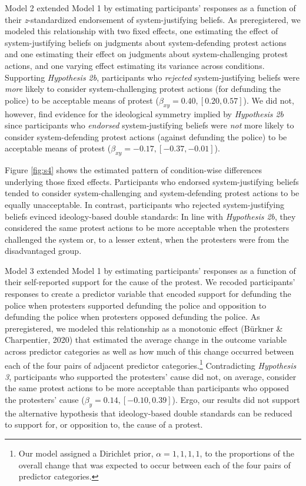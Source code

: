 \documentclass[12pt, letterpaper]{article}
\begin{document}
Model 2 extended Model 1 by estimating participants' responses as a
function of their \emph{z}-standardized endorsement of system-justifying
beliefs. As preregistered, we modeled this relationship with two fixed
effects, one estimating the effect of system-justifying beliefs on
judgments about system-defending protest actions and one estimating
their effect on judgments about system-challenging protest actions, and
one varying effect estimating its variance across conditions. Supporting
\emph{Hypothesis 2b}, participants who \emph{rejected} system-justifying
beliefs were \emph{more} likely to consider system-challenging protest
actions (for defunding the police) to be acceptable means of protest
(\(\beta_{xy} = 0.40, [0.20, 0.57]\)). We did not, however, find
evidence for the ideological symmetry implied by \emph{Hypothesis 2b}
since participants who \emph{endorsed} system-justifying beliefs were
\emph{not} more likely to consider system-defending protest actions
(against defunding the police) to be acceptable means of protest
(\(\beta_{xy} = -0.17, [-0.37, -0.01]\)).

Figure \ref{fig:s4} shows the estimated pattern of condition-wise
differences underlying those fixed effects. Participants who endorsed
system-justifying beliefs tended to consider system-challenging and
system-defending protest actions to be equally unacceptable. In
contrast, participants who rejected system-justifying beliefs evinced
ideology-based double standards: In line with \emph{Hypothesis 2b}, they
considered the same protest actions to be more acceptable when the
protesters challenged the system or, to a lesser extent, when the
protesters were from the disadvantaged group.

Model 3 extended Model 1 by estimating participants' responses as a
function of their self-reported support for the cause of the protest. We
recoded participants' responses to create a predictor variable that
encoded support for defunding the police when protesters supported
defunding the police and opposition to defunding the police when
protesters opposed defunding the police. As preregistered, we modeled
this relationship as a monotonic effect (Bürkner \& Charpentier, 2020)
that estimated the average change in the outcome variable across
predictor categories as well as how much of this change occurred between
each of the four pairs of adjacent predictor categories.\footnote{Our
  model assigned a Dirichlet prior, \(\alpha = {1, 1, 1, 1}\), to the
  proportions of the overall change that was expected to occur between
  each of the four pairs of predictor categories.} Contradicting
\emph{Hypothesis 3}, participants who supported the protesters' cause
did not, on average, consider the same protest actions to be more
acceptable than participants who opposed the protesters' cause
(\(\beta_{y} = 0.14, [-0.10, 0.39]\)). Ergo, our results did not support
the alternative hypothesis that ideology-based double standards can be
reduced to support for, or opposition to, the cause of a protest.
\end{document}
